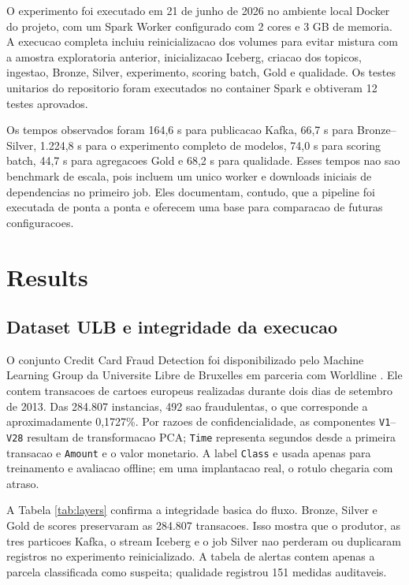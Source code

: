 \documentclass[10pt,twocolumn]{article}
\begin{document}
O experimento foi executado em 21 de junho de 2026 no ambiente local Docker do projeto, com um Spark Worker configurado com 2 cores e 3 GB de memoria. A execucao completa incluiu reinicializacao dos volumes para evitar mistura com a amostra exploratoria anterior, inicializacao Iceberg, criacao dos topicos, ingestao, Bronze, Silver, experimento, scoring batch, Gold e qualidade. Os testes unitarios do repositorio foram executados no container Spark e obtiveram 12 testes aprovados.

Os tempos observados foram 164,6 s para publicacao Kafka, 66,7 s para Bronze--Silver, 1.224,8 s para o experimento completo de modelos, 74,0 s para scoring batch, 44,7 s para agregacoes Gold e 68,2 s para qualidade. Esses tempos nao sao benchmark de escala, pois incluem um unico worker e downloads iniciais de dependencias no primeiro job. Eles documentam, contudo, que a pipeline foi executada de ponta a ponta e oferecem uma base para comparacao de futuras configuracoes.

\section{Results}

\subsection{Dataset ULB e integridade da execucao}

O conjunto Credit Card Fraud Detection foi disponibilizado pelo Machine Learning Group da Universite Libre de Bruxelles em parceria com Worldline \cite{ulb2013}. Ele contem transacoes de cartoes europeus realizadas durante dois dias de setembro de 2013. Das 284.807 instancias, 492 sao fraudulentas, o que corresponde a aproximadamente 0,1727\%. Por razoes de confidencialidade, as componentes \texttt{V1}--\texttt{V28} resultam de transformacao PCA; \texttt{Time} representa segundos desde a primeira transacao e \texttt{Amount} e o valor monetario. A label \texttt{Class} e usada apenas para treinamento e avaliacao offline; em uma implantacao real, o rotulo chegaria com atraso.

A Tabela \ref{tab:layers} confirma a integridade basica do fluxo. Bronze, Silver e Gold de scores preservaram as 284.807 transacoes. Isso mostra que o produtor, as tres particoes Kafka, o stream Iceberg e o job Silver nao perderam ou duplicaram registros no experimento reinicializado. A tabela de alertas contem apenas a parcela classificada como suspeita; qualidade registrou 151 medidas auditaveis.
\end{document}
